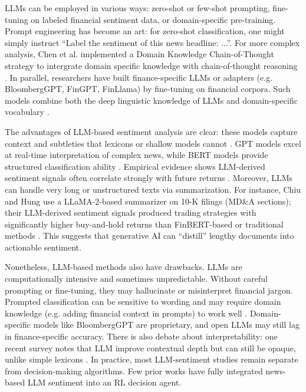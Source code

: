 \gls{LLM}s can be employed in various ways: zero-shot or few-shot prompting, fine-tuning on labeled financial sentiment data, or domain-specific pre-training. Prompt engineering has become an art: for zero-shot classification, one might simply instruct “Label the sentiment of this news headline: ...”. For more complex analysis, Chen et al. implemented a Domain Knowledge Chain-of-Thought strategy to intergrate domain specific knowledge with chain-of-thought reasoning \cite{Chen2025}. In parallel, researchers have built finance-specific \gls{LLM}s or adapters (e.g. BloombergGPT, FinGPT, FinLlama) by fine-tuning on financial corpora. Such models combine both the deep linguistic knowledge of \gls{LLM}s and domain-specific vocabulary \cite{Nie2024}.

The advantages of \gls{LLM}-based sentiment analysis are clear: these models capture context and subtleties that lexicons or shallow models cannot \cite{LiuArulappan2024, Kirtac2024}. \gls{GPT} models excel at real-time interpretation of complex news, while \gls{BERT} models provide structured classification ability \cite{LiuArulappan2024}. Empirical evidence shows \gls{LLM}-derived sentiment signals often correlate strongly with future returns \cite{Fatouros2023, Kirtac2024}. Moreover, \gls{LLM}s can handle very long or unstructured texts via summarization. For instance, Chiu and Hung use a LLaMA-2-based summarizer on 10-K filings (MD\&A sections); their \gls{LLM}-derived sentiment signals produced trading strategies with significantly higher buy-and-hold returns than FinBERT-based or traditional methods \cite{Chiu2024}. This suggests that generative AI can “distill” lengthy documents into actionable sentiment.

Nonetheless, \gls{LLM}-based methods also have drawbacks. \gls{LLM}s are computationally intensive and sometimes unpredictable. Without careful prompting or fine-tuning, they may hallucinate or misinterpret financial jargon. Prompted classification can be sensitive to wording and may require domain knowledge (e.g. adding financial context in prompts) to work well \cite{Chen2025}. Domain-specific models like BloombergGPT are proprietary, and open LLMs may still lag in finance-specific accuracy. There is also debate about interpretability: one recent survey notes that \gls{LLM} improve contextual depth but can still be opaque, unlike simple lexicons \cite{Kirtac2024}. In practice, most LLM-sentiment studies remain separate from decision-making algorithms. Few prior works have fully integrated news-based LLM sentiment into an RL decision agent.

